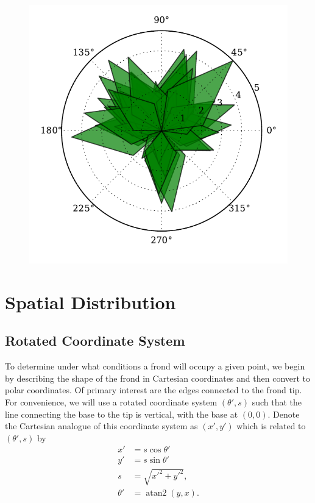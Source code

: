 \documentclass[ms,cpyr,lof,lot]{uathesis}
\DeclareMathOperator{\atantwo}{atan2}
\begin{document}
\begin{figure}[h]
	\centering
	\includegraphics[width=.75\linewidth]{kelp_sample}
	\vspace{-2em}
	\label{fig:kelp_sample}
\end{figure}

\section{Spatial Distribution}
\subsection{Rotated Coordinate System}
\label{sec:rot_coords}
To determine under what conditions a frond will occupy a given point, we begin by
describing the shape of the frond in Cartesian coordinates and then convert to polar coordinates.
Of primary interest are the edges connected to the frond tip.
For convenience, we will use a rotated coordinate system $(\theta',s)$ such that the line connecting the base to the tip is vertical, with the base at $(0,0)$.
Denote the Cartesian analogue of this coordinate system as $(x',y')$ which is related to $(\theta',s)$ by
\begin{align*}
	x' &= s\cos\theta' \\ 
	y' &= s\sin\theta' \\
	s &= \sqrt{x'^2+y'^2}, \\
	\theta' &= \atantwo(y, x).
\end{align*}
\end{document}
